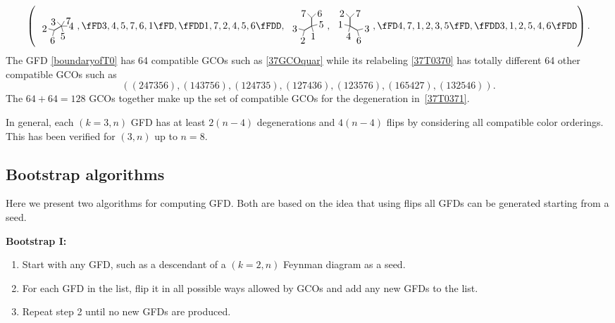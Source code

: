 \documentclass[pdftex]{sigma}
\theoremstyle{definition}
\numberwithin{equation}{section}
\begin{document}
%
\begin{align}
\label{37T0371}
\left({
 \raisebox{-.65 cm}{
\tikz[scale=.3]{
\draw[]
(0,0)--(90:0)--++(90+45:.7) node[left=-2pt]{3}
(0,0)--(90:0)--++(90-30:.7) node[right=-2pt]{7}
(0,0)--(90-120:0)--++(90-120+30:.7) node[right=-2pt]{4}
(0,0)--(90-120:0)--++(90-120-45:.7) node[below=-2pt]{5}
(0,0)--(90+120:1)--++(90+120+45:.7) node[below=-2pt]{6}
(0,0)--(90+120:1)--++(90+120-45:.7) node[left=-2pt]{2}
;
}}},
%
 \fFD 3, 4, 5, 7, 6, 1 \fFD,
 \fFDD 1, 7, 2, 4, 5, 6 \fFDD,
 {
 \raisebox{-.65 cm}{
\tikz[scale=.3]{
\draw[]
(0,0)--(90:1)--++(90+45:.7) node[left=-2pt]{7}
(0,0)--(90:1)--++(90-45:.7) node[right=-2pt]{6}
(0,0)--(90-120:0)--++(90-120+45:.7) node[right=-2pt]{5}
(0,0)--(90-120:0)--++(90-120-45:.7) node[below=-2pt]{1}
(0,0)--(90+120:1)--++(90+120+45:.7) node[below=-2pt]{2}
(0,0)--(90+120:1)--++(90+120-45:.7) node[left=-2pt]{3}
;
}}}
,
%
{
 \raisebox{-.65 cm}{
\tikz[scale=.3]{
\draw[]
(0,0)--(90:1)--++(90+45:.7) node[left=-2pt]{2}
(0,0)--(90:1)--++(90-45:.7) node[right=-2pt]{7}
(0,0)--(90-120:1)--++(90-120+45:.7) node[right=-2pt]{3}
(0,0)--(90-120:1)--++(90-120-45:.7) node[below=-2pt]{6}
(0,0)--(90+120:0)--++(90+120+45:.7) node[below=-2pt]{4}
(0,0)--(90+120:0)--++(90+120-45:.7) node[left=-2pt]{1}
;
}}}
,
%
 \fFD 4, 7, 1, 2, 3, 5 \fFD,
 \fFDD 3, 1, 2, 5, 4, 6 \fFDD
\right).
\end{align}
%
 The GFD \eqref{boundaryofT0} has 64 compatible GCOs such as \eqref{37GCOquar} while its relabeling \eqref{37T0370} has totally different 64 other compatible GCOs such as
\[
((2 4 7 3 5 6),(1 4 3 7 5 6),(1 2 4 7 3 5),(1 2 7 4 3 6),(1 2 3 5 7 6),(1 6 5 4 2 7),(1 3 2 5 4 6)).
\]
The $64+64=128$ GCOs
 together make up the set of compatible GCOs
 for the degeneration in~\eqref{37T0371}.

In general, each $(k=3,n)$ GFD has at least $2(n-4)$ degenerations and $4(n-4)$ flips by considering all compatible color orderings. This has been verified for $(3,n)$ up to $n=8$.

\subsection{Bootstrap algorithms}\label{bootstrapIandII}

Here we present two algorithms for computing GFD. Both are based on the idea that using flips all GFDs can be generated starting from a seed.

{\bf Bootstrap I:}
\begin{enumerate}\itemsep=0pt
\item[(1)] Start with any GFD, such as a descendant of a $(k=2,n)$ Feynman diagram as a seed.
\item[(2)] For each GFD in the list, flip it in all possible ways allowed by GCOs and add any new GFDs to the list.
\item[(3)] Repeat step 2 until no new GFDs are produced.
\end{enumerate}
\end{document}
